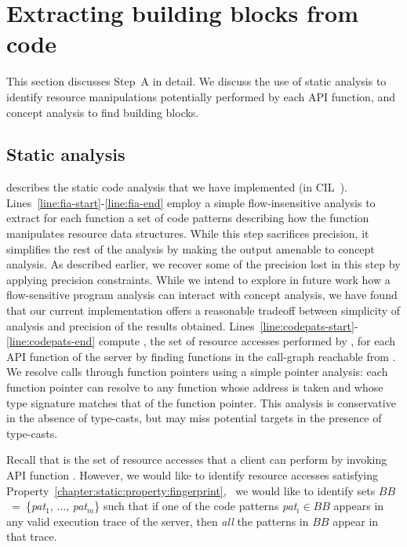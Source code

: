 \section{Extracting building blocks from code}
\label{chapter:static:section:despat}

This section discusses Step~A in detail. We discuss the use of static analysis
to identify resource manipulations potentially performed by each API function,
and concept analysis to find building blocks.

\subsection{Static analysis}
\label{chapter:static:section:despat:staticanalysis}
%
 describes the static code analysis that we have
implemented (in CIL~\cite{nmr+02}).
Lines~\ref{line:fia-start}-\ref{line:fia-end} employ a simple flow-insensitive
analysis to extract for each function a set of code patterns describing how the
function manipulates resource data structures.  While this step sacrifices
precision, it simplifies the rest of the analysis by making the output amenable
to concept analysis. As described earlier, we recover some of the precision
lost in this step by applying precision constraints.  While we intend to
explore in future work how a flow-sensitive program analysis can interact with
concept analysis, we have found that our current implementation offers a
reasonable tradeoff between simplicity of analysis and precision of the results
obtained.  Lines~\ref{line:codepats-start}-\ref{line:codepats-end} compute
, the set of resource accesses performed by ,
for each API function  of the server by finding functions in the
call-graph reachable from . We resolve calls through function
pointers using a simple pointer analysis: each function pointer can resolve to
any function whose address is taken and whose type signature matches that of
the function pointer. This analysis is conservative in the absence of
type-casts, but may miss potential targets in the presence of type-casts. 

Recall that  is the set of resource accesses that a client
can perform by invoking API function . However, we would like to
identify resource accesses satisfying
Property~\ref{chapter:static:property:fingerprint}, \ie~we would like to
identify sets $BB$~=~\{\textit{pat$_1$}, $\ldots$, \textit{pat$_m$}\} such that
if one of the code patterns \textit{pat$_i$}$\in$$BB$ appears in any valid
execution trace of the server, then \textit{all} the patterns in $BB$ appear in
that trace. 

